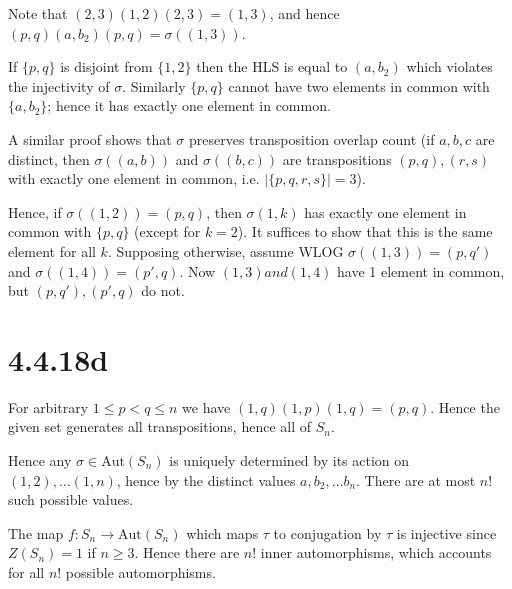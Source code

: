 \documentclass{article}
\def\Aut{\textrm{Aut}}
\begin{document}
Note that $(2, 3)(1, 2)(2, 3) = (1, 3)$, and hence $(p, q)(a, b_2)(p, q) = \sigma((1, 3))$.

If $\{p, q\}$ is disjoint from $\{1, 2\}$ then the HLS is equal to $(a, b_2)$ which violates the injectivity of $\sigma$. Similarly $\{p, q\}$ cannot have two elements in common with $\{a, b_2\}$; hence it has exactly one element in common.

A similar proof shows that $\sigma$ preserves transposition overlap count (if $a, b, c$ are distinct, then $\sigma((a, b))$ and $\sigma((b, c))$ are transpositions $(p, q), (r, s)$ with exactly one element in common, i.e. $|\{p, q, r, s\}| = 3$).

Hence, if $\sigma((1, 2)) = (p, q)$, then $\sigma(1, k)$ has exactly one element in common with $\{p, q\}$ (except for $k=2$). It suffices to show that this is the same element for all $k$. Supposing otherwise, assume WLOG $\sigma((1, 3)) = (p, q')$ and $\sigma((1, 4)) = (p', q)$. Now $(1, 3) and (1, 4)$ have 1 element in common, but $(p, q'), (p', q)$ do not.

\section*{4.4.18d}

For arbitrary $1 \le p < q \le n$ we have $(1, q)(1, p)(1, q) = (p, q)$. Hence the given set generates all transpositions, hence all of $S_n$.

Hence any $\sigma \in \Aut(S_n)$ is uniquely determined by its action on $(1, 2), \ldots (1, n)$, hence by the distinct values $a, b_2, \ldots b_n$. There are at most $n!$ such possible values.

The map $f : S_n \to \Aut(S_n)$ which maps $\tau$ to conjugation by $\tau$ is injective since $Z(S_n) = 1$ if $n \ge 3$. Hence there are $n!$ inner automorphisms, which accounts for all $n!$ possible automorphisms.
\end{document}
